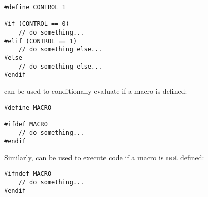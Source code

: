 \documentclass[12pt]{article}
\begin{document}
\begin{lstlisting}[style=cxx]
#define CONTROL 1

#if (CONTROL == 0)
    // do something...
#elif (CONTROL == 1)
    // do something else...
#else
    // do something else...
#endif
\end{lstlisting}

\noindent
{} can be used to conditionally evaluate if a macro is defined:

\begin{lstlisting}[style=cxx]
#define MACRO

#ifdef MACRO
    // do something...
#endif
\end{lstlisting}

\noindent
Similarly,  can be used to execute code if a macro is \textbf{not} defined:

\begin{lstlisting}[style=cxx]
#ifndef MACRO
    // do something...
#endif
\end{lstlisting}

\pagebreak
\end{document}
